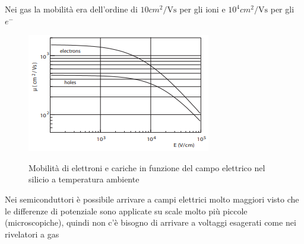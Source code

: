 \vspace{-40pt}\par\noindent\hspace*{0pt}\ignorespaces
Nei gas la mobilità era dell'ordine di $10 cm^2/\text{Vs} $ per gli ioni e $10^4 cm^2/\text{Vs} $ per gli $e^{-}$ 

\hspace{-20pt} 
\begin{minipage}{0.55\textwidth}
    \vspace{-5pt}
    \begin{figure}[H]
        \centering
        \includegraphics[width=\textwidth,frame]{Chapters/images/Interazione_radiazione_materia/image-20220223185948941.png}

        \label{fig:mobilitae}
    \end{figure}
\end{minipage} \hspace{5pt}
\begin{minipage}{0.48\textwidth}
\begin{figure}[H]
    \centering
    \captionsetup{width=\textwidth}
    \vspace{-10pt}
    \caption{Mobilità di elettroni e cariche in funzione del campo elettrico nel silicio a temperatura ambiente}
\end{figure}
\vspace{-30pt}
    \begin{note}Nei semiconduttori è possibile arrivare a campi elettrici molto maggiori visto che le differenze di potenziale sono applicate su scale molto più piccole (microscopiche), quindi non c'è bisogno di arrivare a voltaggi esagerati come nei rivelatori a gas
    
    \end{note}

\end{minipage}


